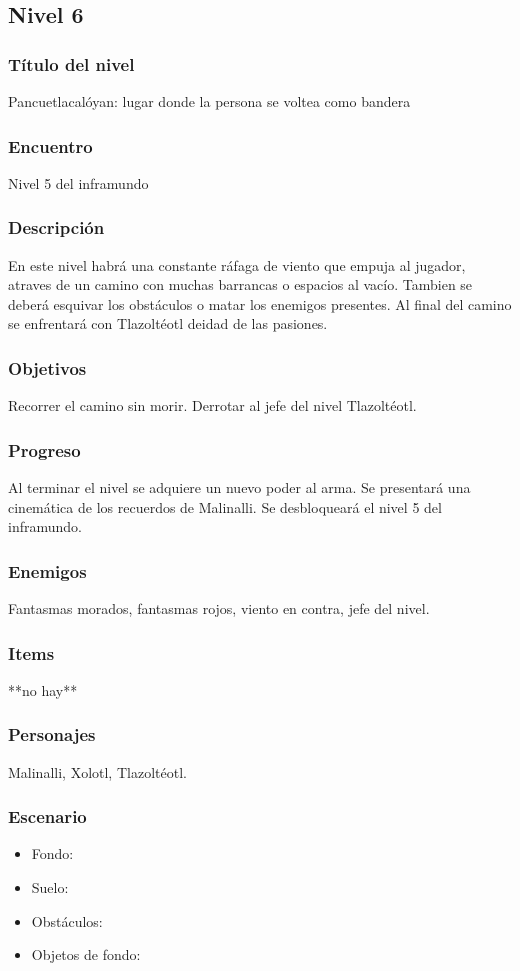 \documentclass[11pt,letterpaper]{article}
\begin{document}
	
	
		\subsection{Nivel 6}
	\subsubsection{Título del nivel}
	Pancuetlacalóyan: lugar donde la persona se voltea como bandera
	\subsubsection{Encuentro}
	Nivel 5 del inframundo
	\subsubsection{Descripción}
	En este nivel habrá una constante ráfaga de viento que empuja al jugador, atraves de un camino con muchas barrancas o espacios al vacío. Tambien se deberá esquivar los obstáculos o matar los enemigos presentes. Al final del camino se enfrentará con Tlazoltéotl deidad de las pasiones.
	\subsubsection{Objetivos}
	Recorrer el camino sin morir. Derrotar al jefe del nivel Tlazoltéotl.
	\subsubsection{Progreso}
	Al terminar el nivel se adquiere un nuevo poder al arma. Se presentará una cinemática de los recuerdos de Malinalli. Se desbloqueará el nivel 5 del inframundo.
	\subsubsection{Enemigos}
	Fantasmas morados, fantasmas rojos, viento en contra, jefe del nivel.
	\subsubsection{Items}
	**no hay**
	\subsubsection{Personajes}
	Malinalli, Xolotl, Tlazoltéotl.
\subsubsection{Escenario}
\begin{itemize} 
	\item Fondo:
	\item Suelo:
	\item Obstáculos:
	\item Objetos de fondo:
\end{itemize}	
\end{document}
